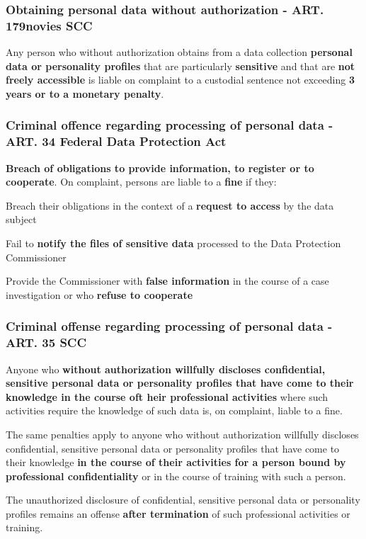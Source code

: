 \subsubsection{Obtaining personal data without authorization - ART. 179novies SCC}
Any person who without authorization obtains from a data collection \textbf{personal data or personality profiles} that are particularly \textbf{sensitive} and that are \textbf{not freely accessible} is liable on complaint to a custodial sentence not exceeding \textbf{3 years or to a monetary penalty}.

\subsubsection{Criminal offence regarding processing of personal data - ART. 34 Federal Data Protection Act}
\textbf{Breach of obligations to provide information, to register or to cooperate}. On complaint, persons are liable to a \textbf{fine} if they:
\begin{compactitem}
	\item Breach their obligations in the context of a \textbf{request to access} by the data subject
	\item Fail to \textbf{notify the files of sensitive data} processed to the Data Protection Commissioner
	\item Provide the Commissioner with \textbf{false information} in the course of a case investigation or who \textbf{refuse to cooperate}
\end{compactitem}

\subsubsection{Criminal offense regarding processing of personal data - ART. 35 SCC}
\begin{compactenum}
	\item Anyone who \textbf{without authorization willfully discloses confidential, sensitive personal data or personality profiles that have come to their knowledge in the course oft heir professional activities} where such activities require the knowledge of such data is, on complaint, liable to a fine.
	\item The same penalties apply to anyone who without authorization willfully discloses confidential, sensitive personal data or personality profiles that have come to their knowledge \textbf{in the course of their activities for a person bound by professional confidentiality} or in the course of training with such a person.
	\item The unauthorized disclosure of confidential, sensitive personal data or personality profiles remains an offense \textbf{after termination} of such professional activities or training.
\end{compactenum}